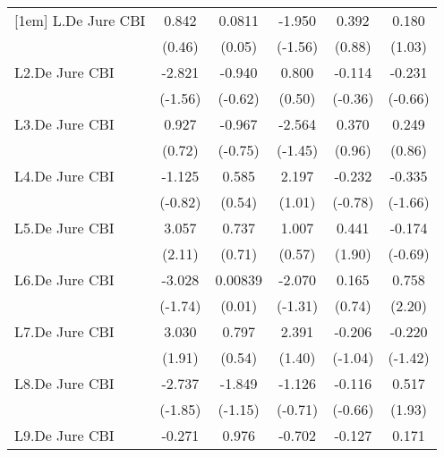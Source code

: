 {\begin{longtable}{l*{5}{c}}
[1em]
L.De Jure CBI   &    0.842         &   0.0811         &   -1.950         &    0.392         &    0.180         \\
                &   (0.46)         &   (0.05)         &  (-1.56)         &   (0.88)         &   (1.03)         \\
[1em]
L2.De Jure CBI  &   -2.821         &   -0.940         &    0.800         &   -0.114         &   -0.231         \\
                &  (-1.56)         &  (-0.62)         &   (0.50)         &  (-0.36)         &  (-0.66)         \\
[1em]
L3.De Jure CBI  &    0.927         &   -0.967         &   -2.564         &    0.370         &    0.249         \\
                &   (0.72)         &  (-0.75)         &  (-1.45)         &   (0.96)         &   (0.86)         \\
[1em]
L4.De Jure CBI  &   -1.125         &    0.585         &    2.197         &   -0.232         &   -0.335         \\
                &  (-0.82)         &   (0.54)         &   (1.01)         &  (-0.78)         &  (-1.66)         \\
[1em]
L5.De Jure CBI  &    3.057\sym{*}  &    0.737         &    1.007         &    0.441         &   -0.174         \\
                &   (2.11)         &   (0.71)         &   (0.57)         &   (1.90)         &  (-0.69)         \\
[1em]
L6.De Jure CBI  &   -3.028         &  0.00839         &   -2.070         &    0.165         &    0.758\sym{*}  \\
                &  (-1.74)         &   (0.01)         &  (-1.31)         &   (0.74)         &   (2.20)         \\
[1em]
L7.De Jure CBI  &    3.030         &    0.797         &    2.391         &   -0.206         &   -0.220         \\
                &   (1.91)         &   (0.54)         &   (1.40)         &  (-1.04)         &  (-1.42)         \\
[1em]
L8.De Jure CBI  &   -2.737         &   -1.849         &   -1.126         &   -0.116         &    0.517         \\
                &  (-1.85)         &  (-1.15)         &  (-0.71)         &  (-0.66)         &   (1.93)         \\
[1em]
L9.De Jure CBI  &   -0.271         &    0.976         &   -0.702         &   -0.127         &    0.171         \\

\end{longtable}}

